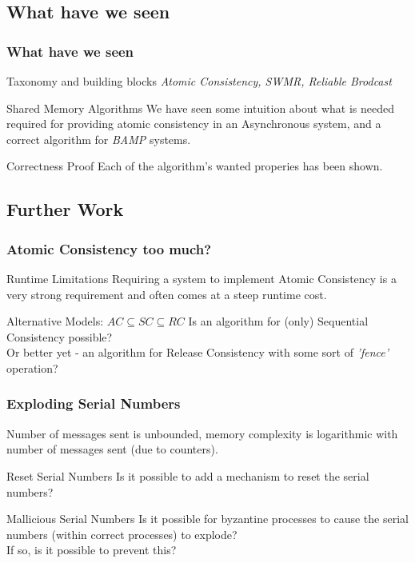 \subsection{What have we seen}
\begin{frame}
    \frametitle{What have we seen}
    \begin{block}{Taxonomy and building blocks}
        \emph{Atomic Consistency, SWMR, Reliable Brodcast}
    \end{block}
    \begin{block}{Shared Memory Algorithms}
        We have seen some intuition
        about what is needed required for providing atomic consistency
        in an Asynchronous system, and a correct algorithm for \emph{BAMP} systems.
    \end{block}
    \begin{block}{Correctness Proof}
        Each of the algorithm's wanted properies has been shown.
    \end{block}
\end{frame}

\subsection{Further Work}
\begin{frame}
    \frametitle{Atomic Consistency too much?}
    \begin{alertblock}{Runtime Limitations}
        Requiring a system to implement Atomic Consistency is a very strong requirement
        and often comes at a steep runtime cost.
    \end{alertblock}
    \begin{block}{Alternative Models: $AC\subseteq SC\subseteq RC$}
        Is an algorithm for (only) Sequential Consistency possible?\\
        Or better yet - an algorithm for Release Consistency with some sort of
        \emph{'fence'} operation?
    \end{block}
\end{frame}

\begin{frame}
    \frametitle{Exploding Serial Numbers}
    Number of messages sent is unbounded, memory complexity
    is logarithmic with number of messages sent (due to counters).
    \begin{block}{Reset Serial Numbers}
        Is it possible to add a mechanism to reset the serial numbers?
    \end{block}
    \begin{block}{Mallicious Serial Numbers}
        Is it possible for byzantine processes to cause the serial numbers (within correct processes) to explode?\\
        If so, is it possible to prevent this?
    \end{block}
\end{frame}

